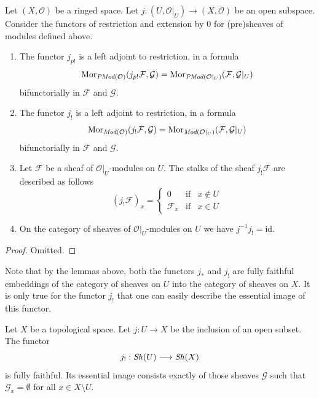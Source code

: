 \begin{lemma}
\label{lemma-j-shriek-modules}
Let $(X, \mathcal{O})$ be a ringed space.
Let $j : (U, \mathcal{O}|_U) \to (X, \mathcal{O})$
be an open subspace.
Consider the functors of restriction and extension
by $0$ for (pre)sheaves of modules defined above.
\begin{enumerate}
\item The functor $j_{p!}$ is a left adjoint to restriction,
in a formula
$$
\mathop{\mathrm{Mor}}\nolimits_{\textit{PMod}(\mathcal{O})}(j_{p!}\mathcal{F}, \mathcal{G})
=
\mathop{\mathrm{Mor}}\nolimits_{\textit{PMod}(\mathcal{O}|_U)}(\mathcal{F}, \mathcal{G}|_U)
$$
bifunctorially in $\mathcal{F}$ and $\mathcal{G}$.
\item The functor $j_!$ is a left adjoint to restriction,
in a formula
$$
\mathop{\mathrm{Mor}}\nolimits_{\textit{Mod}(\mathcal{O})}(j_!\mathcal{F}, \mathcal{G})
=
\mathop{\mathrm{Mor}}\nolimits_{\textit{Mod}(\mathcal{O}|_U)}(\mathcal{F}, \mathcal{G}|_U)
$$
bifunctorially in $\mathcal{F}$ and $\mathcal{G}$.
\item Let $\mathcal{F}$ be a sheaf of $\mathcal{O}|_U$-modules on $U$.
The stalks of the sheaf $j_!\mathcal{F}$ are described
as follows
$$
(j_{!}\mathcal{F})_x =
\left\{
\begin{matrix}
0 & \text{if} & x \not \in U \\
\mathcal{F}_x & \text{if} & x \in U
\end{matrix}
\right.
$$
\item On the category of sheaves of $\mathcal{O}|_U$-modules on $U$
we have $j^{-1}j_! = \text{id}$.
\end{enumerate}
\end{lemma}

\begin{proof}
Omitted.
\end{proof}

\noindent
Note that by the lemmas above, both the functors
$j_*$ and $j_!$ are fully faithful embeddings of
the category of sheaves on $U$ into the category
of sheaves on $X$. It is only true for the functor
$j_!$ that one can easily describe the essential
image of this functor.

\begin{lemma}
\label{lemma-equivalence-categories-open}
Let $X$ be a topological space.
Let $j : U \to X$ be the inclusion of an open subset.
The functor
$$
j_! : \mathop{\mathit{Sh}}\nolimits(U) \longrightarrow \mathop{\mathit{Sh}}\nolimits(X)
$$
is fully faithful. Its essential image consists exactly
of those sheaves $\mathcal{G}$ such that
$\mathcal{G}_x = \emptyset$ for all $x \in X \setminus U$.
\end{lemma}

